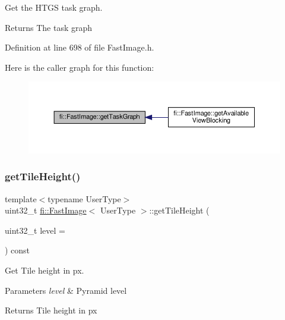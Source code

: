 Get the H\+T\+GS task graph. 

\begin{DoxyReturn}{Returns}
The task graph 
\end{DoxyReturn}


Definition at line 698 of file Fast\+Image.\+h.

Here is the caller graph for this function\+:
\nopagebreak
\begin{figure}[H]
\begin{center}
\leavevmode
\includegraphics[width=350pt]{dc/d6b/classfi_1_1FastImage_a81ec16682f029e8d7f64888c6212066b_icgraph}
\end{center}
\end{figure}
\mbox{\label{classfi_1_1FastImage_ae9f67a164a2e42f7c80b8443080e876b}} 
\subsubsection{\texorpdfstring{get\+Tile\+Height()}{getTileHeight()}}
{\footnotesize\ttfamily template$<$typename User\+Type$>$ \\
uint32\+\_\+t \hyperlink{classfi_1_1FastImage}{fi\+::\+Fast\+Image}$<$ User\+Type $>$\+::get\+Tile\+Height (\begin{DoxyParamCaption}\item[{uint32\+\_\+t}]{level = {} }\end{DoxyParamCaption}) const\hspace{0.3cm}{\ttfamily [inline]}}



Get Tile height in px. 


\begin{DoxyParams}{Parameters}
{\em level} & Pyramid level \\
\hline
\end{DoxyParams}
\begin{DoxyReturn}{Returns}
Tile height in px 
\end{DoxyReturn}


